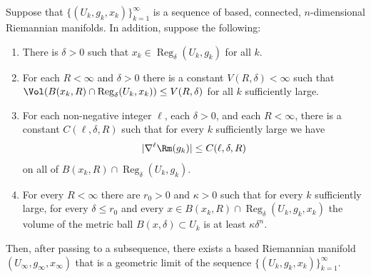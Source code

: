 \begin{theorem}\label{thm:geometric-limit-existence}
\label{basicconv}

Suppose that $\{(U_k,g_k,x_k)\}_{k=1}^\infty$ is a sequence of
based, connected, $n$-dimensional Riemannian manifolds. In addition,
suppose the following:

\begin{enumerate}
\item[(1)] There is $\delta>0$ such that $x_k\in \operatorname{Reg}_\delta(U_k,g_k)$ for all $k$.
\item[(2)] For each $R<\infty$ and $\delta>0$ there is a constant $V(R,\delta)<\infty$ such
that $\Vol(B(x_k,R)\cap \operatorname{Reg}_\delta(U_k,x_k))\le
V(R,\delta)$ for all $k$ sufficiently large.
\item[(3)] For each non-negative integer $\ell$, each $\delta>0$, and each $R<\infty$,
 there is a constant
$C(\ell,\delta,R)$ such that for every $k$ sufficiently large we
have
$$|\nabla^\ell \Rm(g_k)|\le C(\ell,\delta,R)$$
on all of $B(x_k,R)\cap\operatorname{Reg}_\delta(U_k,g_k)$.
\item[(4)] For every $R<\infty$ there are $r_0>0$ and $\kappa>0$ such that
for every $k$ sufficiently large, for every $\delta\le r_0$ and
every $x\in B(x_k,R)\cap \operatorname{Reg}_\delta(U_k,g_k,x_k)$ the volume
of the metric ball $B(x,\delta)\subset U_k$ is at least
$\kappa\delta^n$.
\end{enumerate}
Then, after passing to a subsequence, there exists a based
Riemannian manifold $(U_\infty,g_\infty,x_\infty)$ that is a
geometric limit of the sequence $\{(U_k,g_k,x_k)\}_{k=1}^\infty$.
\end{theorem}



